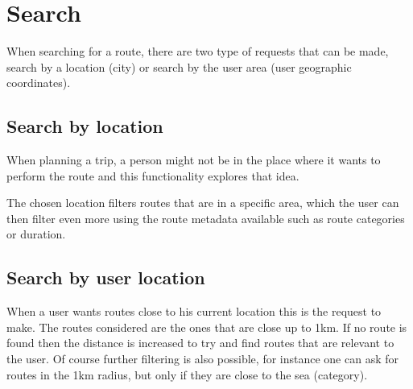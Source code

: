 \chapter{Search}
When searching for a route, there are two type of requests that can be made,
search by a location (city) or search by the user area (user geographic coordinates). 

\section{Search by location}
When planning a trip, a person might not be in the place where it wants to perform the route and
this functionality explores that idea. 

The chosen location filters routes that are in a specific area, which the user can then filter even more
using the route metadata available such as route categories or duration.

\section{Search by user location}
When a user wants routes close to his current location this is the request to make. 
The routes considered are the ones that are close up to 1km. If no route is found then the distance is increased
to try and find routes that are relevant to the user. Of course further filtering is also possible, for instance
one can ask for routes in the 1km radius, but only if they are close to the sea (category). 


